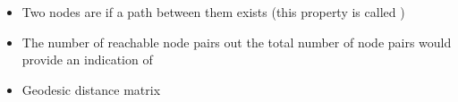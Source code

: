 \documentclass[8pt]{beamer}
\begin{document}
\begin{frame}
\frametitle{\insertsection}
\framesubtitle{\insertsubsection}

\begin{columns}
\begin{itemize}
	\item Two nodes are {\color{blue}{reachable}} if a path between them exists (this property is called {\color{blue}{reachability}})
	\item The number of reachable node pairs out the total number of node pairs would provide an indication of {\color{blue}{network connectivity}}
	\item Geodesic distance matrix
\end{itemize}

\centering
{}
\end{columns}
\end{frame}
\end{document}
